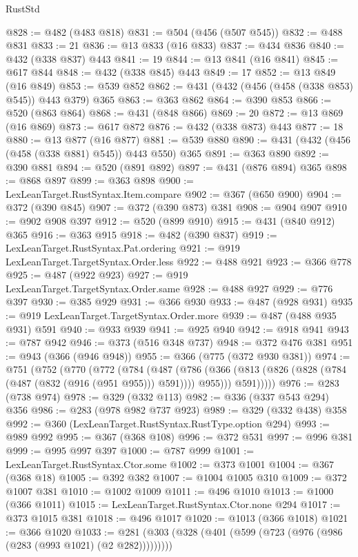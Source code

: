 \begin{lexlean}{RustStd}
\begin{coremodule}
{\begin{coremodule}
{{{{{{{{{{@828 := @482 (@483 @818)
@831 := @504 (@456 (@507 @545))
@832 := @488 @831
@833 := 21
@836 := @13 @833 (@16 @833)
@837 := @434 @836
@840 := @432 (@338 @837) @443
@841 := 19
@844 := @13 @841 (@16 @841)
@845 := @617 @844
@848 := @432 (@338 @845) @443
@849 := 17
@852 := @13 @849 (@16 @849)
@853 := @539 @852
@862 := @431 (@432 (@456 (@458 (@338 @853) @545)) @443 @379) @365
@863 := @363 @862
@864 := @390 @853
@866 := @520 (@863 @864)
@868 := @431 (@848 @866)
@869 := 20
@872 := @13 @869 (@16 @869)
@873 := @617 @872
@876 := @432 (@338 @873) @443
@877 := 18
@880 := @13 @877 (@16 @877)
@881 := @539 @880
@890 := @431 (@432 (@456 (@458 (@338 @881) @545)) @443 @550) @365
@891 := @363 @890
@892 := @390 @881
@894 := @520 (@891 @892)
@897 := @431 (@876 @894) @365
@898 := @868 @897
@899 := @363 @898
@900 := LexLeanTarget.RustSyntax.Item.compare
@902 := @367 (@650 @900)
@904 := @372 (@390 @845)
@907 := @372 (@390 @873) @381
@908 := @904 @907
@910 := @902 @908 @397
@912 := @520 (@899 @910)
@915 := @431 (@840 @912) @365
@916 := @363 @915
@918 := @482 (@390 @837)
@919 := LexLeanTarget.RustSyntax.Pat.ordering
@921 := @919 LexLeanTarget.TargetSyntax.Order.less
@922 := @488 @921
@923 := @366 @778
@925 := @487 (@922 @923)
@927 := @919 LexLeanTarget.TargetSyntax.Order.same
@928 := @488 @927
@929 := @776 @397
@930 := @385 @929
@931 := @366 @930
@933 := @487 (@928 @931)
@935 := @919 LexLeanTarget.TargetSyntax.Order.more
@939 := @487 (@488 @935 @931) @591
@940 := @933 @939
@941 := @925 @940
@942 := @918 @941
@943 := @787 @942
@946 := @373 (@516 @348 @737)
@948 := @372 @476 @381
@951 := @943 (@366 (@946 @948))
@955 := @366 (@775 (@372 @930 @381))
@974 := @751
    (@752
      (@770
        (@772
          (@784
            (@487
              (@786 (@366 (@813 (@826 (@828 (@784 (@487 (@832 (@916 (@951 @955))) @591)))) @955)))
              @591)))))
@976 := @283 (@738 @974)
@978 := @329 (@332 @113)
@982 := @336 (@337 @543 @294) @356
@986 := @283 (@978 @982 @737 @923)
@989 := @329 (@332 @438) @358
@992 := @360 (LexLeanTarget.RustSyntax.RustType.option @294)
@993 := @989 @992
@995 := @367 (@368 @108)
@996 := @372 @531
@997 := @996 @381
@999 := @995 @997 @397
@1000 := @787 @999
@1001 := LexLeanTarget.RustSyntax.Ctor.some
@1002 := @373 @1001
@1004 := @367 (@368 @18)
@1005 := @392 @382
@1007 := @1004 @1005 @310
@1009 := @372 @1007 @381
@1010 := @1002 @1009
@1011 := @496 @1010
@1013 := @1000 (@366 @1011)
@1015 := LexLeanTarget.RustSyntax.Ctor.none @294
@1017 := @373 @1015 @381
@1018 := @496 @1017
@1020 := @1013 (@366 @1018)
@1021 := @366 @1020
@1033 := @281 (@303 (@328 (@401 (@599 (@723 (@976 (@986 (@283 (@993 @1021) (@2 @282)))))))))
}}}}}}}}}}
\end{coremodule}}
\end{coremodule}
\end{lexlean}
